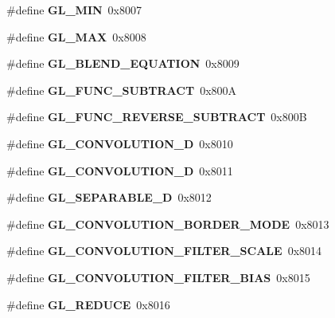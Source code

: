 \begin{DoxyCompactItemize}
\item 
\#define {\bfseries G\+L\+\_\+\+M\+I\+N}~0x8007\label{_s_d_l__opengl_8h_a9aa39c311e7b5958879e80579cc129aa}

\item 
\#define {\bfseries G\+L\+\_\+\+M\+A\+X}~0x8008\label{_s_d_l__opengl_8h_ad615339259858b91f67bf893e2a0b1b7}

\item 
\#define {\bfseries G\+L\+\_\+\+B\+L\+E\+N\+D\+\_\+\+E\+Q\+U\+A\+T\+I\+O\+N}~0x8009\label{_s_d_l__opengl_8h_a2e51c4b0c223640236a52fb26503874b}

\item 
\#define {\bfseries G\+L\+\_\+\+F\+U\+N\+C\+\_\+\+S\+U\+B\+T\+R\+A\+C\+T}~0x800\+A\label{_s_d_l__opengl_8h_ad0017e5c11a6be44b705d87053607fca}

\item 
\#define {\bfseries G\+L\+\_\+\+F\+U\+N\+C\+\_\+\+R\+E\+V\+E\+R\+S\+E\+\_\+\+S\+U\+B\+T\+R\+A\+C\+T}~0x800\+B\label{_s_d_l__opengl_8h_a8439350af7b66d0115f23d27a6511917}

\item 
\#define {\bfseries G\+L\+\_\+\+C\+O\+N\+V\+O\+L\+U\+T\+I\+O\+N\+\_\+D}~0x8010\label{_s_d_l__opengl_8h_aada4e8aa2327463487b11db0a8dee20a}

\item 
\#define {\bfseries G\+L\+\_\+\+C\+O\+N\+V\+O\+L\+U\+T\+I\+O\+N\+\_\+D}~0x8011\label{_s_d_l__opengl_8h_ab6596a0c07d03c03ad72b6406b8fa0da}

\item 
\#define {\bfseries G\+L\+\_\+\+S\+E\+P\+A\+R\+A\+B\+L\+E\+\_\+D}~0x8012\label{_s_d_l__opengl_8h_ae62aef209252ace8373e8aa83fd44eac}

\item 
\#define {\bfseries G\+L\+\_\+\+C\+O\+N\+V\+O\+L\+U\+T\+I\+O\+N\+\_\+\+B\+O\+R\+D\+E\+R\+\_\+\+M\+O\+D\+E}~0x8013\label{_s_d_l__opengl_8h_a927d3aa8df6dcd426be75032bdc8620b}

\item 
\#define {\bfseries G\+L\+\_\+\+C\+O\+N\+V\+O\+L\+U\+T\+I\+O\+N\+\_\+\+F\+I\+L\+T\+E\+R\+\_\+\+S\+C\+A\+L\+E}~0x8014\label{_s_d_l__opengl_8h_a540318e98b09af62428147cceff01d37}

\item 
\#define {\bfseries G\+L\+\_\+\+C\+O\+N\+V\+O\+L\+U\+T\+I\+O\+N\+\_\+\+F\+I\+L\+T\+E\+R\+\_\+\+B\+I\+A\+S}~0x8015\label{_s_d_l__opengl_8h_a8604966237a6b79980b06c249b02f968}

\item 
\#define {\bfseries G\+L\+\_\+\+R\+E\+D\+U\+C\+E}~0x8016\label{_s_d_l__opengl_8h_a1dbc0286954509fbecea26fb49347c0e}


\end{DoxyCompactItemize}
